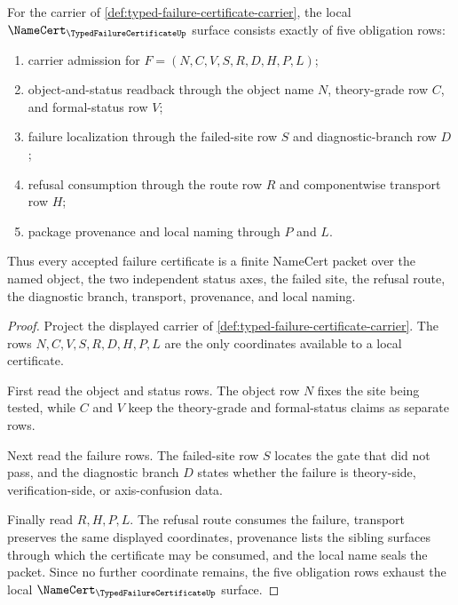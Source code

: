 \begin{theorem}
\label{thm:typed-failure-certificate-namecert-obligations}
For the carrier of \autoref{def:typed-failure-certificate-carrier}, the local $\NameCert_{\TypedFailureCertificateUp}$ surface consists exactly of five obligation rows:
\begin{enumerate}
\item carrier admission for $F=(N,C,V,S,R,D,H,P,L)$;
\item object-and-status readback through the object name $N$, theory-grade row $C$, and formal-status row $V$;
\item failure localization through the failed-site row $S$ and diagnostic-branch row $D$;
\item refusal consumption through the route row $R$ and componentwise transport row $H$;
\item package provenance and local naming through $P$ and $L$.
\end{enumerate}
Thus every accepted failure certificate is a finite NameCert packet over the named object, the two independent status axes, the failed site, the refusal route, the diagnostic branch, transport, provenance, and local naming.
\end{theorem}
\begin{proof}
Project the displayed carrier of \autoref{def:typed-failure-certificate-carrier}. The rows $N,C,V,S,R,D,H,P,L$ are the only coordinates available to a local certificate.

First read the object and status rows. The object row $N$ fixes the site being tested, while $C$ and $V$ keep the theory-grade and formal-status claims as separate rows.

Next read the failure rows. The failed-site row $S$ locates the gate that did not pass, and the diagnostic branch $D$ states whether the failure is theory-side, verification-side, or axis-confusion data.

Finally read $R,H,P,L$. The refusal route consumes the failure, transport preserves the same displayed coordinates, provenance lists the sibling surfaces through which the certificate may be consumed, and the local name seals the packet. Since no further coordinate remains, the five obligation rows exhaust the local $\NameCert_{\TypedFailureCertificateUp}$ surface.
\end{proof}

